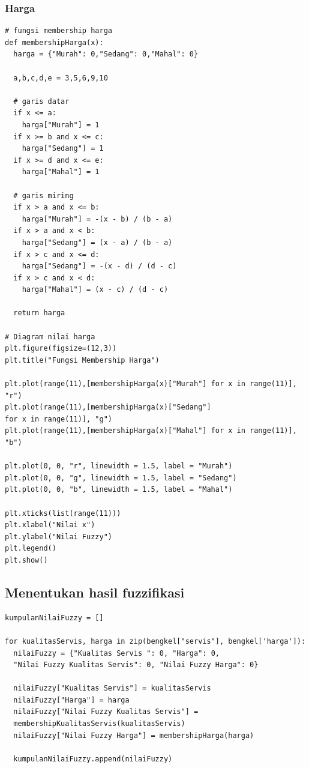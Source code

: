 \documentclass[12pt,a4paper]{article}
\theoremstyle{remark}
\begin{document}
\subsubsection*{Harga}
\begin{verbatim}
# fungsi membership harga
def membershipHarga(x):
  harga = {"Murah": 0,"Sedang": 0,"Mahal": 0}

  a,b,c,d,e = 3,5,6,9,10

  # garis datar
  if x <= a:
    harga["Murah"] = 1
  if x >= b and x <= c:
    harga["Sedang"] = 1
  if x >= d and x <= e:
    harga["Mahal"] = 1

  # garis miring
  if x > a and x <= b:
    harga["Murah"] = -(x - b) / (b - a)
  if x > a and x < b:
    harga["Sedang"] = (x - a) / (b - a)
  if x > c and x <= d:
    harga["Sedang"] = -(x - d) / (d - c)
  if x > c and x < d:
    harga["Mahal"] = (x - c) / (d - c)  
  
  return harga

# Diagram nilai harga
plt.figure(figsize=(12,3))
plt.title("Fungsi Membership Harga")

plt.plot(range(11),[membershipHarga(x)["Murah"] for x in range(11)], "r")
plt.plot(range(11),[membershipHarga(x)["Sedang"] 
for x in range(11)], "g")
plt.plot(range(11),[membershipHarga(x)["Mahal"] for x in range(11)], "b")

plt.plot(0, 0, "r", linewidth = 1.5, label = "Murah")
plt.plot(0, 0, "g", linewidth = 1.5, label = "Sedang")
plt.plot(0, 0, "b", linewidth = 1.5, label = "Mahal")

plt.xticks(list(range(11)))
plt.xlabel("Nilai x")
plt.ylabel("Nilai Fuzzy")
plt.legend()
plt.show()

\end{verbatim}
\subsection*{Menentukan hasil fuzzifikasi}
\begin{verbatim}
kumpulanNilaiFuzzy = []

for kualitasServis, harga in zip(bengkel["servis"], bengkel['harga']):
  nilaiFuzzy = {"Kualitas Servis ": 0, "Harga": 0, 
  "Nilai Fuzzy Kualitas Servis": 0, "Nilai Fuzzy Harga": 0}

  nilaiFuzzy["Kualitas Servis"] = kualitasServis
  nilaiFuzzy["Harga"] = harga
  nilaiFuzzy["Nilai Fuzzy Kualitas Servis"] = 
  membershipKualitasServis(kualitasServis)
  nilaiFuzzy["Nilai Fuzzy Harga"] = membershipHarga(harga)

  kumpulanNilaiFuzzy.append(nilaiFuzzy)
\end{verbatim}
\end{document}
